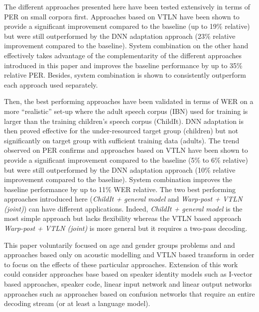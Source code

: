 \documentclass{nle}
\begin{document}
The different approaches presented here have been tested extensively in terms of PER on small corpora first. Approaches based on VTLN have been shown to provide a significant improvement compared to the baseline (up to 19\% relative) but were still outperformed by the DNN adaptation approach (23\% relative improvement compared to the baseline). System combination on the other hand effectively takes advantage of the complementarity of the different approaches introduced in this paper and improves the baseline performance by up to 35\% relative PER. Besides, system combination is shown to consistently outperform each approach used separately.

Then, the best performing approaches have been validated in terms of WER on a more ``realistic'' set-up where the adult speech corpus (IBN) used for training is larger than the training children's speech corpus (ChildIt). DNN adaptation is then proved effective for the  under-resourced target group (children) but not significantly on target group with sufficient training data (adults). The trend observed on PER confirms and approaches based on VTLN have been shown to provide a significant improvement compared to the baseline (5\% to 6\% relative) but were still outperformed by the DNN adaptation approach (10\% relative improvement compared to the baseline). System combination improves the baseline performance by up to 11\% WER relative. The two best performing approaches introduced here ({\em ChildIt + general model} and {\em Warp-post + VTLN (joint)}) can have different applications. Indeed, {\em ChildIt + general model} is the most simple approach but lacks flexibility  whereas the VTLN based approach {\em Warp-post + VTLN (joint)} is more general but it requires a two-pass decoding.

This paper voluntarily focused on age and gender groups problems and and approaches based only on acoustic modelling and VTLN based transform in order to focus on the effects of these particular approaches. Extension of this work could consider approaches base based on speaker identity models such as I-vector based approaches, speaker code, linear input network and linear output networks approaches such as approaches based on confusion networks that require an entire decoding stream (or at least a language model).
\end{document}
